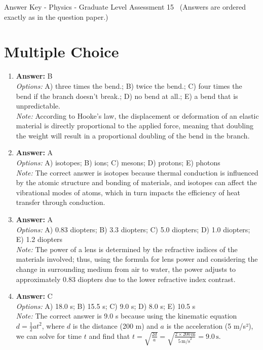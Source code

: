 \documentclass[12pt]{article}
\begin{document}
\begin{center}
Answer Key - Physics - Graduate Level Assessment 15 \
\small (Answers are ordered exactly as in the question paper.)
\end{center}

\section*{Multiple Choice}
\begin{enumerate}[label=\arabic*.]
\item \textbf{Answer:} B
\\ \textit{Options:} A) three times the bend.; B) twice the bend.; C) four times the bend if the branch doesn't break.; D) no bend at all.; E) a bend that is unpredictable.
\\ \textit{Note:} According to Hooke's law, the displacement or deformation of an elastic material is directly proportional to the applied force, meaning that doubling the weight will result in a proportional doubling of the bend in the branch.
\item \textbf{Answer:} A
\\ \textit{Options:} A) isotopes; B) ions; C) mesons; D) protons; E) photons
\\ \textit{Note:} The correct answer is isotopes because thermal conduction is influenced by the atomic structure and bonding of materials, and isotopes can affect the vibrational modes of atoms, which in turn impacts the efficiency of heat transfer through conduction.
\item \textbf{Answer:} A
\\ \textit{Options:} A) 0.83 diopters; B) 3.3 diopters; C) 5.0 diopters; D) 1.0 diopters; E) 1.2 diopters
\\ \textit{Note:} The power of a lens is determined by the refractive indices of the materials involved; thus, using the formula for lens power and considering the change in surrounding medium from air to water, the power adjusts to approximately 0.83 diopters due to the lower refractive index contrast.
\item \textbf{Answer:} C
\\ \textit{Options:} A) 18.0 s; B) 15.5 s; C) 9.0 s; D) 8.0 s; E) 10.5 s
\\ \textit{Note:} The correct answer is 9.0 s because using the kinematic equation \( d = \frac{1}{2} a t^2 \), where \( d \) is the distance (200 m) and \( a \) is the acceleration (5 m/s²), we can solve for time \( t \) and find that \( t = \sqrt{\frac{2 d}{a}} = \sqrt{\frac{2 \times 200 \, \text{m}}{5 \, \text{m/s}^2}} = 9.0 \, \text{s} \).

\end{enumerate}
\end{document}
